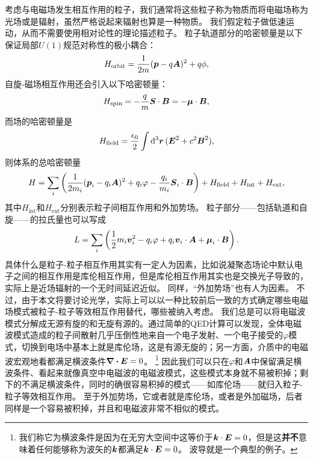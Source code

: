 \documentclass[UTF8, a4paper]{ctexart}
\renewcommand{\emph}{\textbf}
\begin{document}
考虑与电磁场发生相互作用的粒子，我们通常将这些粒子称为物质而将电磁场称为光场或是辐射，虽然严格说起来辐射也算是一种物质。
我们假定粒子做低速运动，从而不需要使用相对论性的理论描述粒子。
粒子轨道部分的哈密顿量是以下保证局部$U(1)$规范对称性的极小耦合：
\begin{equation}
    {H}_\text{orbit} = \frac{1}{2m} ({\vb*{p}} - q \vb*{A})^2 + q \phi,
    \label{eq:minimal-coupling}
\end{equation}
自旋-磁场相互作用还会引入以下哈密顿量：
\begin{equation}
    {H}_\text{spin} = - \frac{q}{m} {\vb*{S}} \cdot \vb*{B} = - \vb*{\mu} \cdot \vb*{B},
\end{equation}
而场的哈密顿量是
\begin{equation}
    {H}_\text{field} = \frac{\epsilon_0}{2} \int \dd[3]{\vb*{r}} (\vb*{E}^2 + c^2 \vb*{B}^2),
\end{equation}
则体系的总哈密顿量
\begin{equation}
    {H} = \sum_i \left( \frac{1}{2m_i} ({\vb*{p}_i} - q_i \vb*{A})^2 + q_i \varphi - \frac{q_i}{m_i} \vb*{S}_i \cdot \vb*{B} \right) + {H}_\text{field} + {H}_\text{int} + {H}_\text{ext},
\end{equation}
其中${H}_\text{int}$和${H}_\text{ext}$分别表示粒子间相互作用和外加势场。
粒子部分——包括轨道和自旋——的拉氏量也可以写成
\begin{equation}
    L = \sum_i \left( \frac{1}{2} m_i \vb*{v}_i^2 - q_i \varphi + q_i \vb*{v}_i \cdot \vb*{A} + \vb*{\mu}_i \cdot \vb*{B} \right).
\end{equation}
具体什么是粒子-粒子相互作用其实有一定人为因素，比如说凝聚态场论中默认电子之间的相互作用是库伦相互作用，但是库伦相互作用其实也是交换光子导致的，实际上是近场辐射的一个无时间延迟近似。
同样，“外加势场”也有人为因素。
不过，由于本文将要讨论光学，实际上可以以一种比较前后一致的方式确定哪些电磁场模式被粒子-粒子等效相互作用替代，哪些被纳入考虑。
我们总是可以将电磁波模式分解成无源有旋的和无旋有源的。通过简单的QED计算可以发现，全体电磁波模式造成的粒子间散射几乎压倒性地来自一个电子发射、一个电子接受的$\varphi$模式，切换到电场中基本上就是库伦场，这是有源无旋的；另一方面，介质中的电磁波宏观地看都满足横波条件$\div{\vb*{E}}=0$。%
\footnote{
    我们称它为横波条件是因为在无穷大空间中这等价于$\vb*{k} \cdot \vb*{E} = 0$，但是这\emph{并不}意味着任何能够称为波矢的$\vb*{k}$都满足$\vb*{k} \cdot \vb*{E} = 0$。
    波导就是一个典型的例子。
}%
因此我们可以只在$\varphi$和$\vb*{A}$中保留满足横波条件、看起来就像真空中电磁波的电磁波模式，这些模式本身就不易被积掉；剩下的不满足横波条件，同时的确很容易积掉的模式——如库伦场——就归入粒子-粒子等效相互作用。
至于外加势场，它或者就是库伦场，或者是外加磁场，后者同样是一个容易被积掉，并且和电磁波非常不相似的模式。
\end{document}
